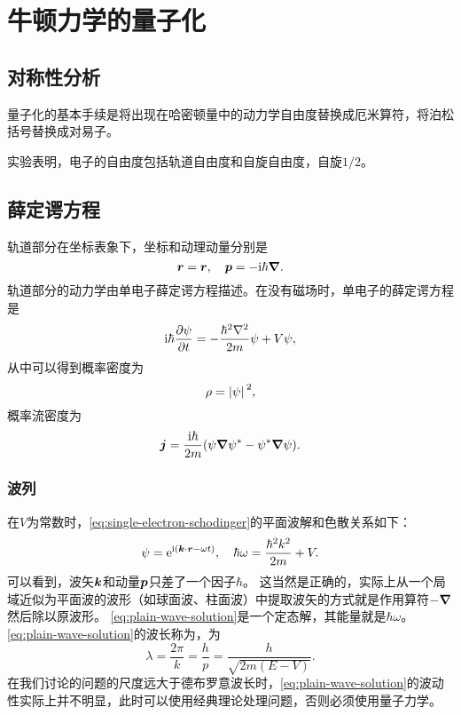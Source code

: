 \chapter{牛顿力学的量子化}

\section{对称性分析}

量子化的基本手续是将出现在哈密顿量中的动力学自由度替换成厄米算符，将泊松括号替换成对易子。

实验表明，电子的自由度包括轨道自由度和自旋自由度，自旋$1/2$。

\section{薛定谔方程}

轨道部分在坐标表象下，坐标和动理动量分别是
\begin{equation}
    {\vb*{r}} = \vb*{r}, \quad {\vb*{p}} = -\mathrm{i} \hbar \grad.
    \label{eq:single-electron-schodinger}
\end{equation}
轨道部分的动力学由单电子薛定谔方程描述。在没有磁场时，单电子的薛定谔方程是
\begin{equation}
    \ii \hbar \pdv{\psi}{t} = - \frac{\hbar^2 \laplacian}{2m} \psi + V \psi,
\end{equation}
从中可以得到概率密度为
\begin{equation}
    \rho = \abs*{\psi}^2,
\end{equation}
概率流密度为
\begin{equation}
    \vb*{j} = \frac{\mathrm{i} \hbar}{2m} (\psi \grad{\psi^*} - \psi^* \grad{\psi}).
\end{equation}

\subsection{波列}

在$V$为常数时，\eqref{eq:single-electron-schodinger}的平面波解和色散关系如下：
\begin{equation}
    \psi = \mathrm{e}^{\mathrm{i}(\vb*{k} \cdot \vb*{r} - \omega t)}, \quad \hbar \omega = \frac{\hbar^2 k^2}{2m} + V.
    \label{eq:plain-wave-solution}
\end{equation}
可以看到，波矢$\vb*{k}$和动量$\vb*{p}$只差了一个因子$\hbar$。
这当然是正确的，实际上从一个局域近似为平面波的波形（如球面波、柱面波）中提取波矢的方式就是作用算符$-\grad$然后除以原波形。
\eqref{eq:plain-wave-solution}是一个定态解，其能量就是$\hbar \omega$。
\eqref{eq:plain-wave-solution}的波长称为，为
\begin{equation}
    \lambda = \frac{2\pi}{k} = \frac{h}{p} = \frac{h}{\sqrt{2m(E-V)}}.
\end{equation}
在我们讨论的问题的尺度远大于德布罗意波长时，\eqref{eq:plain-wave-solution}的波动性实际上并不明显，此时可以使用经典理论处理问题，否则必须使用量子力学。

